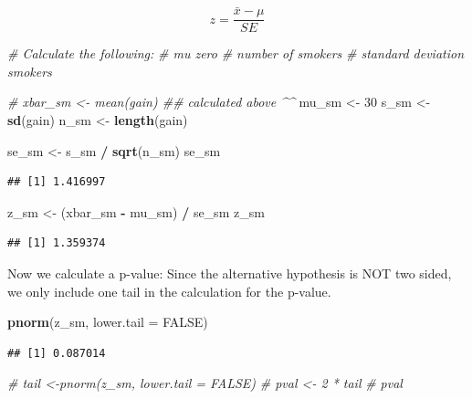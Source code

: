 \documentclass[
]{article}
\newenvironment{Shaded}{\begin{snugshade}}{\end{snugshade}}
\newcommand{\AttributeTok}[1]{\textcolor[rgb]{0.13,0.29,0.53}{#1}}
\newcommand{\CommentTok}[1]{\textcolor[rgb]{0.56,0.35,0.01}{\textit{#1}}}
\newcommand{\ConstantTok}[1]{\textcolor[rgb]{0.56,0.35,0.01}{#1}}
\newcommand{\DecValTok}[1]{\textcolor[rgb]{0.00,0.00,0.81}{#1}}
\newcommand{\FunctionTok}[1]{\textcolor[rgb]{0.13,0.29,0.53}{\textbf{#1}}}
\newcommand{\NormalTok}[1]{#1}
\newcommand{\OtherTok}[1]{\textcolor[rgb]{0.56,0.35,0.01}{#1}}
\newcommand{\SpecialCharTok}[1]{\textcolor[rgb]{0.81,0.36,0.00}{\textbf{#1}}}
\begin{document}
\[ z = \frac{\bar{x} - \mu}{SE} \]

\begin{Shaded}
\begin{Highlighting}[]
\CommentTok{\# Calculate the following:}
\CommentTok{\# mu zero}
\CommentTok{\# number of smokers}
\CommentTok{\# standard deviation smokers}

\CommentTok{\# xbar\_sm \textless{}{-} mean(gain)   \#\# calculated above \^{}\^{}}
\NormalTok{mu\_sm }\OtherTok{\textless{}{-}} \DecValTok{30}
\NormalTok{s\_sm }\OtherTok{\textless{}{-}} \FunctionTok{sd}\NormalTok{(gain)}
\NormalTok{n\_sm }\OtherTok{\textless{}{-}} \FunctionTok{length}\NormalTok{(gain)}

\NormalTok{se\_sm }\OtherTok{\textless{}{-}}\NormalTok{ s\_sm }\SpecialCharTok{/} \FunctionTok{sqrt}\NormalTok{(n\_sm)}
\NormalTok{se\_sm}
\end{Highlighting}
\end{Shaded}

\begin{verbatim}
## [1] 1.416997
\end{verbatim}

\begin{Shaded}
\begin{Highlighting}[]
\NormalTok{z\_sm }\OtherTok{\textless{}{-}}\NormalTok{ (xbar\_sm }\SpecialCharTok{{-}}\NormalTok{ mu\_sm) }\SpecialCharTok{/}\NormalTok{ se\_sm}
\NormalTok{z\_sm}
\end{Highlighting}
\end{Shaded}

\begin{verbatim}
## [1] 1.359374
\end{verbatim}

Now we calculate a p-value: Since the alternative hypothesis is NOT two
sided, we only include one tail in the calculation for the p-value.

\begin{Shaded}
\begin{Highlighting}[]
\FunctionTok{pnorm}\NormalTok{(z\_sm, }\AttributeTok{lower.tail =} \ConstantTok{FALSE}\NormalTok{)}
\end{Highlighting}
\end{Shaded}

\begin{verbatim}
## [1] 0.087014
\end{verbatim}

\begin{Shaded}
\begin{Highlighting}[]
\CommentTok{\# tail \textless{}{-}pnorm(z\_sm, lower.tail = FALSE)}
\CommentTok{\# pval \textless{}{-} 2 * tail}
\CommentTok{\# pval}
\end{Highlighting}
\end{Shaded}
\end{document}
